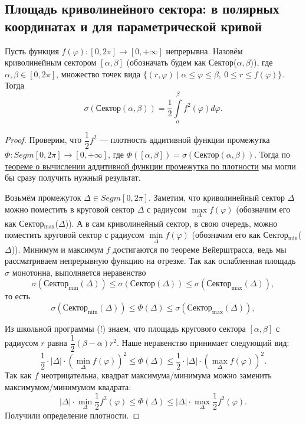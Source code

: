 \subsection{Площадь криволинейного сектора: в полярных координатах и для параметрической кривой}

\begin{theorem}
	Пусть функция \(f(\varphi) \colon [0, 2\pi] \to [0, +\infty]\) непрерывна. Назовём криволинейным сектором \([\alpha, \beta]\) (обозначать будем как Сектор(\(\alpha, \beta\))), где \(\alpha, \beta \in [0, 2\pi]\), множество точек вида \(\{(r, \varphi) \mid \alpha \leqslant \varphi \leqslant \beta, \ 0 \leqslant r \leqslant f(\varphi)\}\). Тогда
	\begin{equation} \label{sigma_1}
		\sigma(\text{Сектор}(\alpha, \beta)) = \frac{1}{2}\int\limits_\alpha^\beta f^2(\varphi) d\varphi.
	\end{equation}
\end{theorem}

\begin{proof}
	Проверим, что \(\dfrac{1}{2}f^2\) --- плотность аддитивной функции промежутка \(\Phi \colon Segm [0, 2\pi] \to [0, +\infty]\), где \(\Phi([\alpha, \beta]) = \sigma(\text{Сектор}(\alpha, \beta))\). Тогда по \hyperlink{afp}{теореме о вычислении аддитивной функции промежутка по плотности} мы могли бы сразу получить нужный результат.
	
	Возьмём промежуток \(\Delta \in Segm [0, 2\pi]\). Заметим, что криволинейный сектор \(\Delta\) можно поместить в круговой сектор \(\Delta\) с радиусом \(\max\limits_\Delta f(\varphi)\) (обозначим его как Сектор\(_{\max}\)(\(\Delta\))). А в сам криволинейный сектор, в свою очередь, можно поместить круговой сектор с радиусом \(\min\limits_\Delta f(\varphi)\) (обозначим его как Сектор\(_{\min}\)(\(\Delta\))). Минимум и максимум \(f\) достигаются по теореме Вейерштрасса, ведь мы рассматриваем непрерывную функцию на отрезке. Так как ослабленная площадь \(\sigma\) монотонна, выполняется неравенство \[
		\sigma(\text{Сектор}_{\min}(\Delta)) \leqslant \sigma(\text{Сектор}(\Delta)) \leqslant \sigma(\text{Сектор}_{\max}(\Delta)),
	\]
	то есть \[
		\sigma(\text{Сектор}_{\min}(\Delta)) \leqslant \Phi(\Delta) \leqslant \sigma(\text{Сектор}_{\max}(\Delta)),
	\]
	
	Из школьной программы (!) знаем, что площадь кругового сектора \([\alpha, \beta]\) с радиусом \(r\) равна \(\dfrac{1}{2} (\beta - \alpha) r^2\). Наше неравенство принимает следующий вид: \[
		\frac{1}{2} \cdot |\Delta| \cdot (\min_\Delta f(\varphi))^2 \leqslant \Phi(\Delta) \leqslant \frac{1}{2} \cdot |\Delta| \cdot (\max_\Delta f(\varphi))^2.
	\]
	Так как \(f\) неотрицательна, квадрат максимума/минимума можно заменить максимумом/минимумом квадрата: \[
		|\Delta| \cdot \min_\Delta \frac{1}{2} f^2(\varphi) \leqslant \Phi(\Delta) \leqslant |\Delta| \cdot \max_\Delta \frac{1}{2} f^2(\varphi).
	\]
	Получили определение плотности.
\end{proof}

